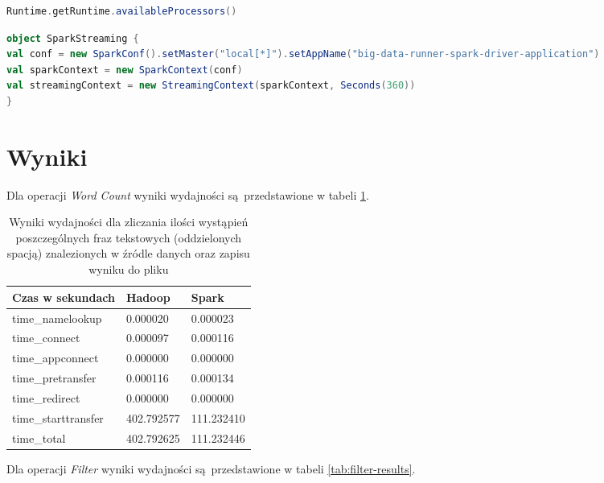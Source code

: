 \begin{lstlisting}[language=scala, caption={Metoda zwracająca liczbę dostępnych wątków wirtualnej maszyny Java},captionpos=b, label={lst:jvm-threads-access}]
Runtime.getRuntime.availableProcessors() 
\end{lstlisting}
\begin{lstlisting}[language=scala, caption={Konfigracja klastra dla Apache Spark},captionpos=b, label={lst:spark-cluster-config}]
object SparkStreaming {
val conf = new SparkConf().setMaster("local[*]").setAppName("big-data-runner-spark-driver-application")
val sparkContext = new SparkContext(conf)
val streamingContext = new StreamingContext(sparkContext, Seconds(360))
}
\end{lstlisting} 
\section{Wyniki}
Dla operacji \textit{Word Count} wyniki wydajności są przedstawione w tabeli \ref{tab:word-count-results}. 
\begin{table}[]
	\centering
	\caption{Wyniki wydajności dla zliczania ilości wystąpień poszczególnych fraz tekstowych (oddzielonych spacją) znalezionych w źródle danych oraz zapisu wyniku do pliku}
	\label{tab:word-count-results}
	\begin{tabular}{|l|l|l|}
		\hline
		Czas w sekundach    & Hadoop     & Spark      \\ \hline
		time\_namelookup    & 0.000020   & 0.000023   \\ \hline
		time\_connect       & 0.000097   & 0.000116   \\ \hline
		time\_appconnect    & 0.000000   & 0.000000   \\ \hline
		time\_pretransfer   & 0.000116   & 0.000134   \\ \hline
		time\_redirect      & 0.000000   & 0.000000   \\ \hline
		time\_starttransfer & 402.792577 & 111.232410 \\ \hline
		time\_total         & 402.792625 & 111.232446 \\ \hline
	\end{tabular}
\end{table}
Dla operacji \textit{Filter} wyniki wydajności są przedstawione w tabeli \ref{tab:filter-results}.
